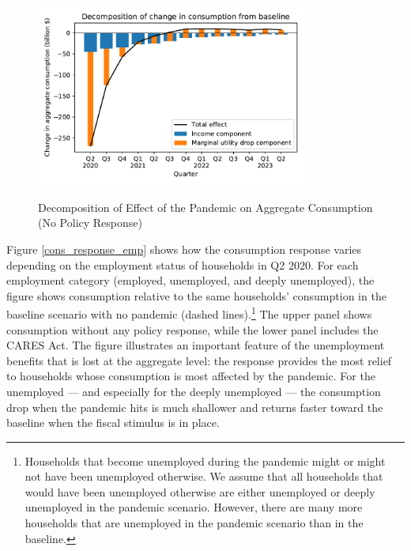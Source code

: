 \documentclass[titlepage]{\econtex}
\begin{document}
\begin{figure}
  \centering
  \caption{Decomposition of Effect of the Pandemic on Aggregate Consumption (No Policy Response)}
  \label{cons_response2}
  { \includegraphics[width=0.8\textwidth]{./Figures/Decomposition}}
\end{figure}

Figure \ref{cons_response_emp} shows how the consumption response varies depending on the employment status of households in Q2 2020.
For each employment category (employed, unemployed, and deeply unemployed), the figure shows consumption relative to the same households' consumption in the baseline scenario with no pandemic (dashed lines).\footnote{Households that become unemployed during the pandemic might or might not have been unemployed otherwise. We assume that all households that would have been unemployed otherwise are either unemployed or deeply unemployed in the pandemic scenario. However, there are many more households that are unemployed in the pandemic scenario than in the baseline.}
The upper panel shows consumption without any policy response, while the lower panel includes the CARES Act.
The figure illustrates an important feature of the unemployment benefits that is lost at the aggregate level: the response provides the most relief to households whose consumption is most affected by the pandemic.
For the unemployed --- and especially for the deeply unemployed --- the consumption drop when the pandemic hits is much shallower and returns faster toward the baseline when the fiscal stimulus is in place.
\end{document}

